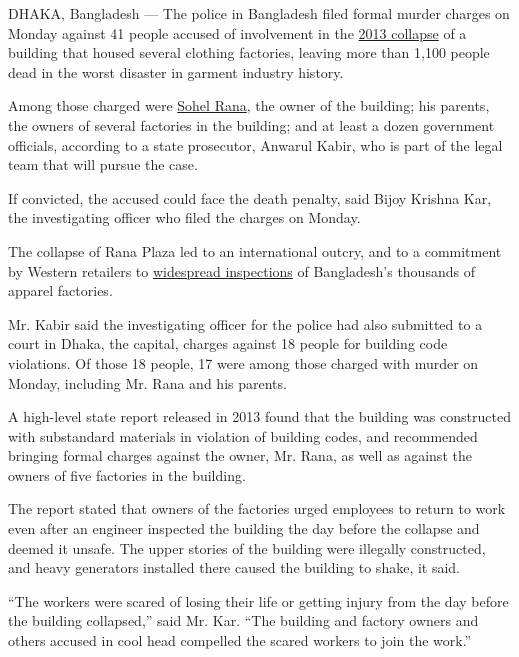 DHAKA, Bangladesh --- The police in Bangladesh filed formal murder
charges on Monday against 41 people accused of involvement in the
\href{http://www.nytimes3xbfgragh.onion/2013/04/25/world/asia/bangladesh-building-collapse.html}{2013
collapse} of a building that housed several clothing factories, leaving
more than 1,100 people dead in the worst disaster in garment industry
history.

Among those charged were
\href{http://www.nytimes3xbfgragh.onion/2013/05/01/world/asia/bangladesh-garment-industry-reliant-on-flimsy-oversight.html}{Sohel
Rana}, the owner of the building; his parents, the owners of several
factories in the building; and at least a dozen government officials,
according to a state prosecutor, Anwarul Kabir, who is part of the legal
team that will pursue the case.

If convicted, the accused could face the death penalty, said Bijoy
Krishna Kar, the investigating officer who filed the charges on Monday.

The collapse of Rana Plaza led to an international outcry, and to a
commitment by Western retailers to
\href{http://www.nytimes3xbfgragh.onion/2013/09/02/business/global/superficial-visits-and-trickery-undermine-foreign-factory-inspections.html}{widespread
inspections} of Bangladesh's thousands of apparel factories.

Mr. Kabir said the investigating officer for the police had also
submitted to a court in Dhaka, the capital, charges against 18 people
for building code violations. Of those 18 people, 17 were among those
charged with murder on Monday, including Mr. Rana and his parents.

A high-level state report released in 2013 found that the building was
constructed with substandard materials in violation of building codes,
and recommended bringing formal charges against the owner, Mr. Rana, as
well as against the owners of five factories in the building.

The report stated that owners of the factories urged employees to return
to work even after an engineer inspected the building the day before the
collapse and deemed it unsafe. The upper stories of the building were
illegally constructed, and heavy generators installed there caused the
building to shake, it said.

``The workers were scared of losing their life or getting injury from
the day before the building collapsed,'' said Mr. Kar. ``The building
and factory owners and others accused in cool head compelled the scared
workers to join the work.''

